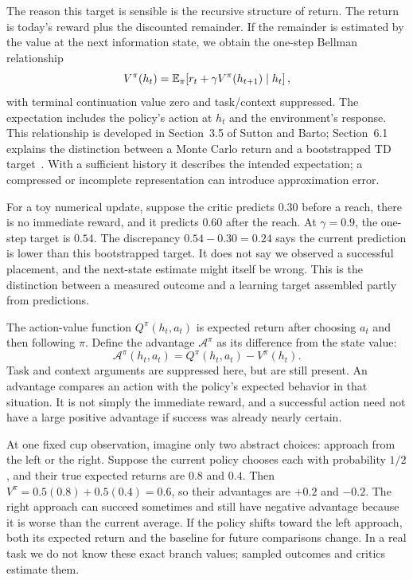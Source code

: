 The reason this target is sensible is the recursive structure of return. The return is today's reward plus the discounted remainder. If the remainder is estimated by the value at the next information state, we obtain the one-step Bellman relationship
\begin{equation}
 V^\pi(h_t)=\mathbb{E}_{\pi}\!\left[r_t+\gamma V^\pi(h_{t+1})\mid h_t\right],
 \label{eq:bellman}
\end{equation}
with terminal continuation value zero and task/context suppressed. The expectation includes the policy's action at $h_t$ and the environment's response. This relationship is developed in Section~3.5 of Sutton and Barto; Section~6.1 explains the distinction between a Monte Carlo return and a bootstrapped TD target~\citep{suttonbarto}. With a sufficient history it describes the intended expectation; a compressed or incomplete representation can introduce approximation error.

For a toy numerical update, suppose the critic predicts $0.30$ before a reach, there is no immediate reward, and it predicts $0.60$ after the reach. At $\gamma=0.9$, the one-step target is $0.54$. The discrepancy $0.54-0.30=0.24$ says the current prediction is lower than this bootstrapped target. It does not say we observed a successful placement, and the next-state estimate might itself be wrong. This is the distinction between a measured outcome and a learning target assembled partly from predictions.

The action-value function $Q^\pi(h_t,a_t)$ is expected return after choosing $a_t$ and then following $\pi$. Define the advantage $\mathcal A^\pi$ as its difference from the state value:
\begin{equation}
 \mathcal A^\pi(h_t,a_t)=Q^\pi(h_t,a_t)-V^\pi(h_t).
 \label{eq:advantage}
\end{equation}
Task and context arguments are suppressed here, but are still present. An advantage compares an action with the policy's expected behavior in that situation. It is not simply the immediate reward, and a successful action need not have a large positive advantage if success was already nearly certain.

At one fixed cup observation, imagine only two abstract choices: approach from the left or the right. Suppose the current policy chooses each with probability $1/2$, and their true expected returns are $0.8$ and $0.4$. Then $V^\pi=0.5(0.8)+0.5(0.4)=0.6$, so their advantages are $+0.2$ and $-0.2$. The right approach can succeed sometimes and still have negative advantage because it is worse than the current average. If the policy shifts toward the left approach, both its expected return and the baseline for future comparisons change. In a real task we do not know these exact branch values; sampled outcomes and critics estimate them.

